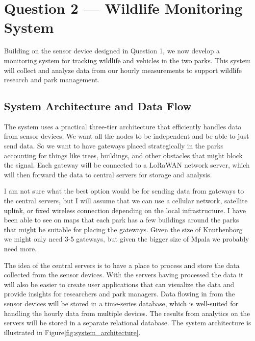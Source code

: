 \section{Question 2 --- Wildlife Monitoring System}

Building on the sensor device designed in Question 1, we now develop a monitoring system for tracking wildlife and vehicles in the two parks. This system will collect and analyze data from our hourly measurements to support wildlife research and park management.

\subsection{System Architecture and Data Flow}

The system uses a practical three-tier architecture that efficiently handles data from sensor devices. We want all the nodes to be independent and be able to just send data. So we want to have gateways placed strategically in the parks accounting for things like trees, buildings, and other obstacles that might block the signal. Each gateway will be connected to a LoRaWAN network server, which will then forward the data to central servers for storage and analysis. 

I am not sure what the best option would be for sending data from gateways to the central servers, but I will assume that we can use a cellular network, satellite uplink, or fixed wireless connection depending on the local infrastructure. I have been able to see on maps that each park has a few buildings around the parks that might be suitable for placing the gateways. Given the size of Knuthenborg we might only need 3-5 gateways, but given the bigger size of Mpala we probably need more.

The idea of the central servers is to have a place to process and store the data collected from the sensor devices. With the servers having processed the data it will also be easier to create user applications that can visualize the data and provide insights for researchers and park managers. Data flowing in from the sensor devices will be stored in a time-series database, which is well-suited for handling the hourly data from multiple devices. The results from analytics on the servers will be stored in a separate relational database. The system architecture is illustrated in Figure\ref{fig:system_architecture}.   


